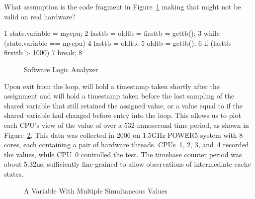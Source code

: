 \QuickQuiz{}
	What assumption is the code fragment
	in Figure~\ref{fig:advsync:Software Logic Analyzer}
	making that might not be valid on real hardware?
 \QuickQuizEnd

{ \scriptsize
\begin{verbbox}
  1 state.variable = mycpu;
  2 lasttb = oldtb = firsttb = gettb();
  3 while (state.variable == mycpu) {
  4   lasttb = oldtb;
  5   oldtb = gettb();
  6   if (lasttb - firsttb > 1000)
  7     break;
  8 }
\end{verbbox}
}
\begin{figure}[htbp]
\centering
\theverbbox
\caption{Software Logic Analyzer}
\label{fig:advsync:Software Logic Analyzer}
\end{figure}

Upon exit from the loop,  will hold a timestamp
taken shortly after the assignment and  will hold
a timestamp taken before the last sampling of the shared variable
that still retained the assigned value, or a value equal to 
if the shared variable had changed before entry into the loop.
This allows us to plot each CPU's view of the value of 
over a 532-nanosecond time period, as shown in
Figure~\ref{fig:advsync:A Variable With Multiple Simultaneous Values}.
This data was collected in 2006 on 1.5GHz POWER5 system with 8 cores,
each containing a pair of hardware threads.
CPUs~1, 2, 3, and~4 recorded the values, while CPU~0 controlled the test.
The timebase counter period was about 5.32ns, sufficiently fine-grained
to allow observations of intermediate cache states.

\begin{figure}[htb]
\centering
{}
\caption{A Variable With Multiple Simultaneous Values}
\label{fig:advsync:A Variable With Multiple Simultaneous Values}
\end{figure}

